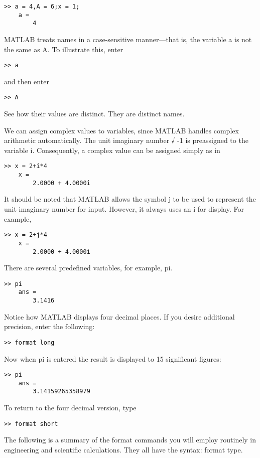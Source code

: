 \documentclass[../main.tex]{subfiles}
\begin{document}
\begin{lstlisting}[frame=none, numbers=none]
	>> a = 4,A = 6;x = 1;
	a =
		4
\end{lstlisting}
MATLAB treats names in a case-sensitive manner—that is, the variable a is not the
same as A. To illustrate this, enter

\begin{lstlisting}[frame=none, numbers=none]
	>> a
\end{lstlisting}
and then enter

\begin{lstlisting}[frame=none, numbers=none]
	>> A
\end{lstlisting}
See how their values are distinct. They are distinct names.

We can assign complex values to variables, since MATLAB handles complex arithmetic automatically. The unit imaginary number √
-1 is preassigned to the variable i.
Consequently, a complex value can be assigned simply as in
\begin{lstlisting}[frame=none, numbers=none]
	>> x = 2+i*4
	x =
		2.0000 + 4.0000i
\end{lstlisting}

It should be noted that MATLAB allows the symbol j to be used to represent the unit imaginary number for input. However, it always uses an i for display. For example,
\begin{lstlisting}[frame=none, numbers=none]
	>> x = 2+j*4
	x =
		2.0000 + 4.0000i
\end{lstlisting}

There are several predefined variables, for example, pi.
\begin{lstlisting}[frame=none, numbers=none]
	>> pi
	ans =
		3.1416
\end{lstlisting}

Notice how MATLAB displays four decimal places. If you desire additional precision,
enter the following:
\begin{lstlisting}[frame=none, numbers=none]
	>> format long
\end{lstlisting}
Now when pi is entered the result is displayed to 15 significant figures:
\begin{lstlisting}[frame=none, numbers=none]
	>> pi
	ans =
		3.14159265358979
\end{lstlisting}
To return to the four decimal version, type
\begin{lstlisting}[frame=none, numbers=none]
	>> format short
\end{lstlisting}
The following is a summary of the format commands you will employ routinely in engineering and scientific calculations. They all have the syntax: format type.
\end{document}
